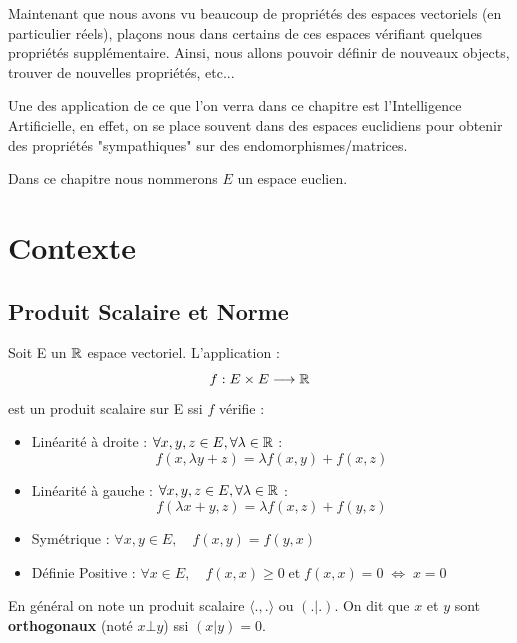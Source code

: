 

\setlength{\parindent}{0pt}
\renewcommand{\labelitemi}{\textbullet} %


Maintenant que nous avons vu beaucoup de propriétés des espaces vectoriels (en particulier réels), plaçons nous dans 
certains de ces espaces vérifiant quelques propriétés supplémentaire. Ainsi, nous allons pouvoir définir de nouveaux 
objects, trouver de nouvelles propriétés, etc... 

Une des application de ce que l'on verra dans ce chapitre est l'Intelligence Artificielle, en effet, on se place souvent 
dans des espaces euclidiens pour obtenir des propriétés "sympathiques" sur des endomorphismes/matrices. 

\vspace{0.3cm}

Dans ce chapitre nous nommerons $E$ un espace euclien. 


\section{Contexte}

\subsection{Produit Scalaire et Norme}

\begin{definition}
    Soit E un $\mathbb{R}$ espace vectoriel. L'application : \[ f : E \times E \longrightarrow \mathbb{R}  \] est un {produit scalaire} sur E ssi $f$ vérifie :
    \begin{itemize}
        \item {Linéarité à droite : } $\forall x, y, z \in E, \forall \lambda \in \mathbb{R} $ : \[ f(x, \lambda y + z) = \lambda f(x, y) + f(x, z) \] 
        \item {Linéarité à gauche : } $\forall x, y, z \in E, \forall \lambda \in \mathbb{R} $ : \[ f(\lambda x + y, z) = \lambda f(x, z) + f(y, z) \] 
        \item {Symétrique : } $ \forall x, y \in E, \quad f(x, y) = f(y, x) $
        \item {Définie Positive : } $ \forall x \in E, \quad f(x, x) \geqslant0 \; \text{et} \; f(x, x) = 0 \; \Longleftrightarrow \; x = 0 $
    \end{itemize}
    En général on note un produit scalaire $\langle ., . \rangle$ ou $(.|.)$. 
    On dit que $x$ et $y$ sont \textbf{orthogonaux} (noté $ x \bot y $) ssi $(x|y) = 0$.
\end{definition}

